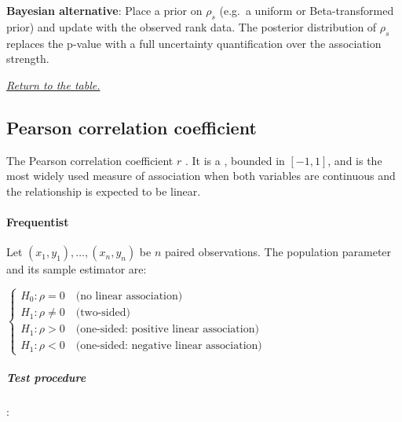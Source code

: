 \textbf{Bayesian alternative}: Place a prior on $\rho_s$ (e.g.\ a uniform or
Beta-transformed prior) and update with the observed rank data. The posterior distribution
of $\rho_s$ replaces the p-value with a full uncertainty quantification over the
association strength.

\textit{\hyperref[statistical_method_table]{Return to the table.}}

\subsection{Pearson correlation coefficient}

The Pearson correlation coefficient $r$ . It is a ,
bounded in $[-1, 1]$, and is the most widely used measure of association when both
variables are continuous and the relationship is expected to be linear.

\paragraph{Frequentist}

Let $(x_1, y_1), \ldots, (x_n, y_n)$ be $n$ paired observations. The population
parameter and its sample estimator are:

\begin{center}
\qquad
{}
\end{center}

$\begin{cases}
    H_0: \rho = 0 \quad \text{(no linear association)} \\
    H_1: \rho \neq 0 \quad \text{(two-sided)} \\
    H_1: \rho > 0 \quad \text{(one-sided: positive linear association)} \\
    H_1: \rho < 0 \quad \text{(one-sided: negative linear association)}
\end{cases}$

\subparagraph{Test procedure}:

